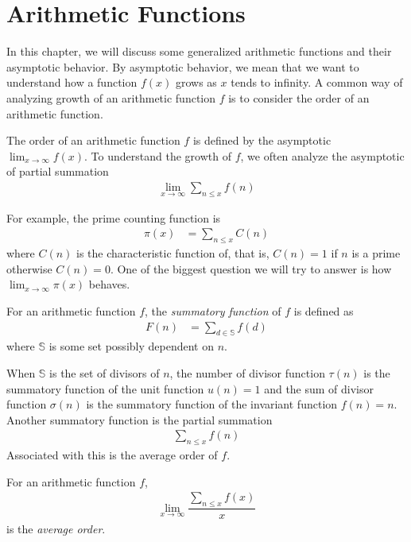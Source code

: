 \documentclass[elemannt.tex]{subfile}
\begin{document}
	\chapter{Arithmetic Functions}\label{ch:arith}
	In this chapter, we will discuss some generalized arithmetic functions and their asymptotic behavior. By asymptotic behavior, we mean that we want to understand how a function $f(x)$ grows as $x$ tends to infinity. A common way of analyzing growth of an arithmetic function $f$ is to consider the order of an arithmetic function.
		\begin{definition}
			The order of an arithmetic function $f$ is defined by the asymptotic $\lim_{x\to\infty}f(x)$. To understand the growth of $f$, we often analyze the asymptotic of partial summation
				\begin{align*}
					\lim\limits_{x\to\infty}\sum_{n\leq x}f(n)
				\end{align*}
		\end{definition}
	For example, the prime counting function is
		\begin{align*}
			\pi(x)
				& = \sum_{n\leq x}C(n)
		\end{align*}
	where $C(n)$ is the characteristic function of, that is, $C(n)=1$ if $n$ is a prime otherwise $C(n)=0$. One of the biggest question we will try to answer is how $\lim_{x\to\infty}\pi(x)$ behaves.
		\begin{definition}
			For an arithmetic function $f$, the \textit{summatory function} of $f$ is defined as
				\begin{align*}
					F(n)
						& = \sum_{d\in \mathbb{S}}f(d)
				\end{align*}
			where $\mathbb{S}$ is some set possibly dependent on $n$.
		\end{definition}
	When $\mathbb{S}$ is the set of divisors of $n$, the number of divisor function $\tau(n)$ is the summatory function of the unit function $u(n)=1$ and the sum of divisor function $\sigma(n)$ is the summatory function of the invariant function $f(n)=n$. Another summatory function is the partial summation
		\begin{align*}
			\sum_{n\leq x}f(n)
		\end{align*}
	Associated with this is the average order of $f$.
		\begin{definition}
			 For an arithmetic function $f$,
				\begin{align*}
					\lim\limits_{x\to\infty}\dfrac{\sum_{n\leq x}f(x)}{x}
				\end{align*}
			is the \textit{average order}.
		\end{definition}
\end{document}
